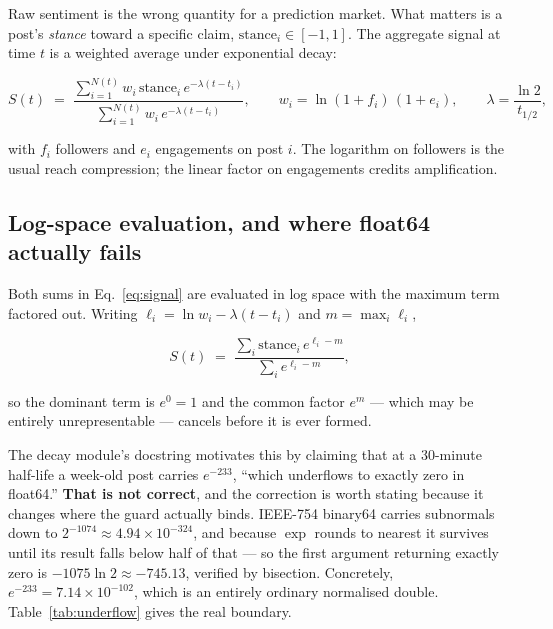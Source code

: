 \documentclass[11pt]{article}
\begin{document}
Raw sentiment is the wrong quantity for a prediction market. What matters is a
post's \emph{stance} toward a specific claim, $\text{stance}_i \in [-1,1]$. The
aggregate signal at time $t$ is a weighted average under exponential decay:

\begin{equation}
S(t) \;=\;
\frac{\sum_{i=1}^{N(t)} w_i \, \text{stance}_i \, e^{-\lambda (t - t_i)}}
     {\sum_{i=1}^{N(t)} w_i \, e^{-\lambda (t - t_i)}},
\qquad
w_i = \ln(1 + f_i)\,(1 + e_i),
\qquad
\lambda = \frac{\ln 2}{t_{1/2}},
\label{eq:signal}
\end{equation}

with $f_i$ followers and $e_i$ engagements on post $i$. The logarithm on
followers is the usual reach compression; the linear factor on engagements
credits amplification.

\subsection{Log-space evaluation, and where float64 actually fails}

Both sums in Eq.~\ref{eq:signal} are evaluated in log space with the maximum
term factored out. Writing $\ell_i = \ln w_i - \lambda(t - t_i)$ and
$m = \max_i \ell_i$,

\begin{equation}
S(t) \;=\;
\frac{\sum_i \text{stance}_i \, e^{\ell_i - m}}{\sum_i e^{\ell_i - m}},
\label{eq:logspace}
\end{equation}

so the dominant term is $e^0 = 1$ and the common factor $e^{m}$ --- which may
be entirely unrepresentable --- cancels before it is ever formed.

The decay module's docstring motivates this by claiming that at a 30-minute
half-life a week-old post carries $e^{-233}$, ``which underflows to exactly zero
in float64.'' \textbf{That is not correct}, and the correction is worth stating
because it changes where the guard actually binds. IEEE-754 binary64 carries
subnormals down to $2^{-1074} \approx 4.94 \times 10^{-324}$, and because
$\exp$ rounds to nearest it survives until its result falls below half of that
--- so the first argument returning exactly zero is
$-1075 \ln 2 \approx -745.13$, verified by bisection. Concretely,
$e^{-233} = 7.14\times10^{-102}$, which is an entirely ordinary normalised
double. Table~\ref{tab:underflow} gives the real boundary.
\end{document}
